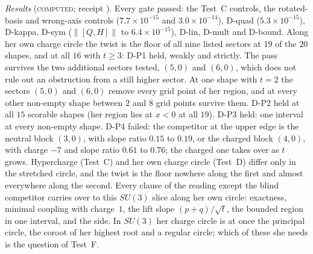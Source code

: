 \documentclass[11pt]{article}
\theoremstyle{definition}
\theoremstyle{remark}
\newcommand{\norm}[1]{\lVert #1\rVert}
\newcommand{\COMPUTED}{\textsc{computed}}
\begin{document}
\emph{Results} (\COMPUTED; receipt ). Every gate passed:
the Test~C controls, the rotated-basis and wrong-axis controls ($7.7\times10^{-15}$ and $3.0\times10^{-14}$), D-quad
($5.3\times10^{-15}$), D-kappa, D-sym ($\norm{[Q,H]}$ to $6.4\times10^{-15}$), D-lin, D-mult and D-bound. Along her own
charge circle the twist is the floor of all nine listed sectors at $19$ of the $20$ shapes, and at all $16$ with $t\ge3$:
D-P1 held, weakly and strictly. The pass survives the two additional sectors tested, $(5,0)$ and $(6,0)$, which does not
rule out an obstruction from a still higher sector. At one shape with $t=2$ the sectors $(5,0)$ and
$(6,0)$ remove every grid point of her region, and at every other non-empty shape between $2$ and $8$ grid points
survive them. D-P2 held at all $15$ scorable shapes (her region lies at $x<0$ at all $19$). D-P3 held: one interval at
every non-empty shape. D-P4 failed: the competitor at the upper edge is the neutral block $(3,0)$, with slope ratio
$0.15$ to $0.19$, or the charged block $(4,0)$, with charge $-7$ and slope ratio $0.61$ to $0.76$; the charged one takes
over as $t$ grows. Hypercharge (Test~C) and her own charge circle (Test~D) differ only in the stretched circle, and the
twist is the floor nowhere along the first and almost everywhere along the second. Every clause of the reading except
the blind competitor carries over to this $SU(3)$ slice along her own circle: exactness, minimal coupling with charge~$1$,
the lift slope $(p+q)/\sqrt t$, the bounded region in one interval, and the side. In $SU(3)$ her charge circle is at once
the principal circle, the coroot of her highest root and a regular circle; which of these she needs is the question of
Test~F.
\end{document}

